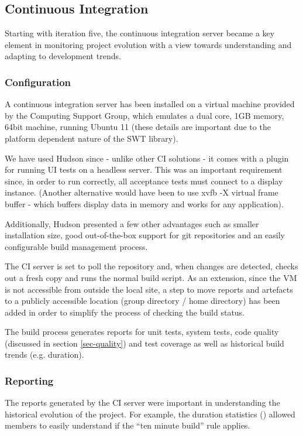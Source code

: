 \documentclass[10pt]{article}
\begin{document}
\subsection{Continuous Integration}

Starting with iteration five, the continuous integration server became a key element in monitoring project evolution with a view towards understanding and adapting to development trends.

\subsubsection{Configuration}
A continuous integration server has been installed on a virtual machine provided by the Computing Support Group, which emulates a dual core, 1GB memory, 64bit machine, running Ubuntu 11 (these details are important due to the platform dependent nature of the SWT library).

We have used Hudson since - unlike other CI solutions - it comes with a plugin for running UI tests on a headless server. This was an important requirement since, in order to run correctly, all acceptance tests must connect to a display instance. (Another alternative would have been to use xvfb -X virtual frame buffer - which buffers display data in memory and works for any application).

Additionally, Hudson presented a few other advantages such as smaller installation size, good out-of-the-box support for git repositories and an easily configurable build management process.

The CI server is set to poll the repository and, when changes are detected, checks out a fresh copy and runs the normal build script. As an extension, since the VM is not accessible from outside the local site, a step to move reports and artefacts to a publicly accessible location (group directory / home directory) has been added in order to simplify the process of checking the build status.

The build process generates reports for unit tests, system tests, code quality (discussed in section \ref{sec-quality}) and test coverage as well as historical build trends (e.g. duration).

\subsubsection{Reporting}
The reports generated by the CI server were important in understanding the historical evolution of the project. For example, the duration statistics (\cite{pic-buildtime}) allowed members to easily understand if the ``ten minute build'' rule applies.
\end{document}

